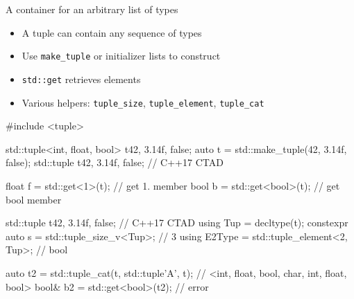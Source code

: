\begin{frame}[fragile]
  \begin{block}{A container for an arbitrary list of types}
    \begin{itemize}
      \item A tuple can contain any sequence of types
      \item Use \texttt{make\_tuple} or initializer lists to construct
      \item \texttt{std::get} retrieves elements
      \item Various helpers: \texttt{tuple\_size}, \texttt{tuple\_element}, \texttt{tuple\_cat}
    \end{itemize}
  \end{block}
  \vspace{-1em}
  \begin{overprint}
    \begin{exampleblock}{}
      \begin{cppcode*}{}
        #include <tuple>

        std::tuple<int, float, bool> t{42, 3.14f, false};
        auto t = std::make_tuple(42, 3.14f, false);
        std::tuple t{42, 3.14f, false}; // C++17 CTAD

        float f = std::get<1>(t);   // get 1. member
        bool b = std::get<bool>(t); // get bool member
      \end{cppcode*}
    \end{exampleblock}

    \begin{exampleblock}{}
      \begin{cppcode*}{}
        std::tuple t{42, 3.14f, false}; // C++17 CTAD
        using Tup = decltype(t);
        constexpr auto s = std::tuple_size_v<Tup>; // 3
        using E2Type = std::tuple_element<2, Tup>; // bool

        auto t2 = std::tuple_cat(t, std::tuple{'A'}, t);
          // <int, float, bool, char, int, float, bool>
        bool& b2 = std::get<bool>(t2); // error
      \end{cppcode*}
    \end{exampleblock}
  \end{overprint}
\end{frame}

